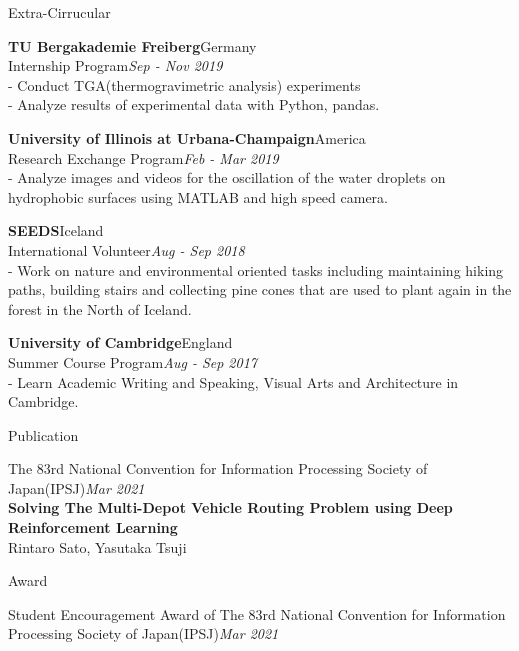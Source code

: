 \documentclass{resume} %
\begin{document}
\begin{rSection}{Extra-Cirrucular} 
\item {\bf TU Bergakademie Freiberg}\hfill {Germany}\\Internship Program\hfill {\em Sep - Nov 2019}\\- Conduct TGA(thermogravimetric analysis) experiments\\- Analyze results of experimental data with Python, pandas.
\item {\bf University of Illinois at Urbana-Champaign}\hfill {America}\\Research Exchange Program\hfill {\em Feb - Mar 2019}\\- Analyze images and videos for the oscillation of the water droplets on hydrophobic surfaces using MATLAB and high speed camera.
\item {\bf SEEDS}\hfill {Iceland}\\International Volunteer\hfill {\em Aug - Sep 2018}\\- Work on nature and environmental oriented tasks including maintaining hiking paths, building stairs and collecting pine cones that are used to plant again in the forest in the North of Iceland.
\item {\bf University of Cambridge}\hfill {England}\\Summer Course Program\hfill {\em Aug - Sep 2017}\\- Learn Academic Writing and Speaking, Visual Arts and Architecture in Cambridge.
\end{rSection}


\begin{rSection}{Publication}
 \item The 83rd National Convention for Information Processing Society of Japan(IPSJ)\hfill {\em Mar 2021}\\{\bf Solving The Multi-Depot Vehicle Routing Problem using Deep Reinforcement Learning}\\\hfill {Rintaro Sato, Yasutaka Tsuji}
\end{rSection}

\begin{rSection}{Award}
 \item Student Encouragement Award of The 83rd National Convention for Information Processing Society of Japan(IPSJ)\hfill {\em Mar 2021}
\end{rSection}
\end{document}
